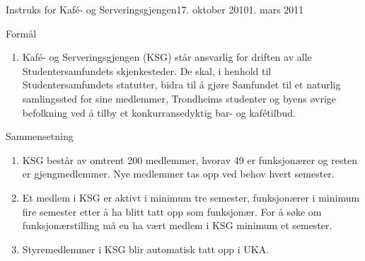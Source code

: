 \documentclass[../fsbok.tex]{subfiles}
\begin{document}
\begin{instruks}{Instruks for Kaf\'e- og Serveringsgjengen}{17. oktober 2010}{1. mars 2011}

    \begin{instruksledd}{Formål}
        \begin{enumerate}
            \item Kafé- og Serveringsgjengen (KSG) står ansvarlig for driften av alle
                Studentersamfundets skjenkesteder. De skal, i henhold til Studentersamfundets statutter, bidra til å
                gjøre Samfundet til et naturlig samlingssted for sine medlemmer, Trondheims studenter og byens
                øvrige befolkning ved å tilby et konkurransedyktig bar- og kafétilbud.
        \end{enumerate}
    \end{instruksledd}

    \begin{instruksledd}{Sammensetning}
        \begin{enumerate}
            \item KSG består av omtrent 200 medlemmer, hvorav 49 er funksjonærer og resten er
                gjengmedlemmer. Nye medlemmer tas opp ved behov hvert semester.
            \item Et medlem i KSG er aktivt i minimum tre semester, funksjonærer i minimum fire
                semester etter å ha blitt tatt opp som funksjonær. For å søke om funksjonærstilling må en ha vært
                medlem i KSG minimum et semester.
            \item Styremedlemmer i KSG blir automatisk tatt opp i UKA.
        \end{enumerate}
    \end{instruksledd}


\end{instruks}
\end{document}
